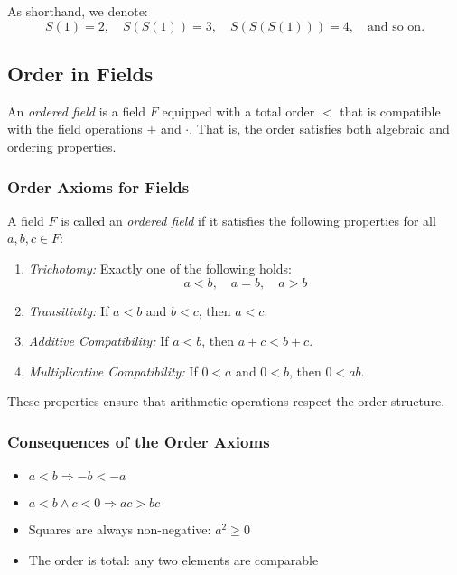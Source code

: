 As shorthand, we denote:
\[
	S(1) = 2, \quad S(S(1)) = 3, \quad S(S(S(1))) = 4, \quad \text{and so on.}
\]

\subsection{Order in Fields}

An \emph{ordered field} is a field \( F \) equipped with a total order \( < \) that is compatible with the field operations \( + \) and \( \cdot \). That is, the order satisfies both algebraic and ordering properties.

\subsubsection{Order Axioms for Fields}

A field \( F \) is called an \emph{ordered field} if it satisfies the following properties for all \( a, b, c \in F \):

\begin{enumerate}[label=\Roman*.]
    \item \emph{Trichotomy:} Exactly one of the following holds:
    \[
    a < b, \quad a = b, \quad a > b
    \]

    \item \emph{Transitivity:} If \( a < b \) and \( b < c \), then \( a < c \).

    \item \emph{Additive Compatibility:} If \( a < b \), then \( a + c < b + c \).

    \item \emph{Multiplicative Compatibility:} If \( 0 < a \) and \( 0 < b \), then \( 0 < ab \).
\end{enumerate}

These properties ensure that arithmetic operations respect the order structure.

\subsubsection{Consequences of the Order Axioms}

\begin{itemize}[label=\(-\)]
    \item \( a < b \Rightarrow -b < -a \)
    \item \( a < b \land c < 0 \Rightarrow ac > bc \)
    \item Squares are always non-negative: \( a^2 \ge 0 \)
    \item The order is total: any two elements are comparable
\end{itemize}

